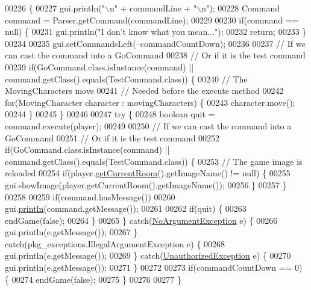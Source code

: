 \begin{DoxyCode}
00226                                                    \{
00227         gui.println(\textcolor{stringliteral}{"\(\backslash\)n"} + commandLine + \textcolor{stringliteral}{"\(\backslash\)n"});
00228         Command command = Parser.getCommand(commandLine);
00229 
00230         \textcolor{keywordflow}{if}(command == null) \{
00231             gui.println(\textcolor{stringliteral}{"I don't know what you mean..."});
00232             \textcolor{keywordflow}{return};
00233         \}
00234 
00235         gui.setCommandsLeft(--commandCountDown);
00236 
00237         \textcolor{comment}{// If we can cast the command into a GoCommand}
00238         \textcolor{comment}{// Or if it is the test command}
00239         \textcolor{keywordflow}{if}(GoCommand.class.isInstance(command) || command.getClass().equals(TestCommand.class)) \{
00240             \textcolor{comment}{// The MovingCharacters move}
00241             \textcolor{comment}{// Needed before the execute method}
00242             \textcolor{keywordflow}{for}(MovingCharacter character : movingCharacters) \{
00243                 character.move();
00244             \}
00245         \}
00246 
00247         \textcolor{keywordflow}{try} \{
00248             \textcolor{keywordtype}{boolean} quit = command.execute(player);
00249 
00250             \textcolor{comment}{// If we can cast the command into a GoCommand}
00251             \textcolor{comment}{// Or if it is the test command}
00252             \textcolor{keywordflow}{if}(GoCommand.class.isInstance(command) || command.getClass().equals(TestCommand.class)) \{
00253                 \textcolor{comment}{// The game image is reloaded}
00254                 \textcolor{keywordflow}{if}(player.\hyperlink{classpkg__world_1_1Player_a5ff0ede152d97c0c9cf6603c9a422a77}{getCurrentRoom}().getImageName() != null) \{
00255                     gui.showImage(player.getCurrentRoom().getImageName());
00256                 \}
00257             \}
00258 
00259             \textcolor{keywordflow}{if}(command.hasMessage())
00260                 gui.\hyperlink{classpkg__game_1_1UserInterface_ac4d82f989416d7cc64a6e2fba2f4ed75}{println}(command.getMessage());
00261 
00262             \textcolor{keywordflow}{if}(quit) \{
00263                 endGame(\textcolor{keyword}{false});
00264             \}
00265         \} \textcolor{keywordflow}{catch}(\hyperlink{classpkg__exceptions_1_1NoArgumentException}{NoArgumentException} e) \{
00266             gui.println(e.getMessage());
00267         \} \textcolor{keywordflow}{catch}(pkg\_exceptions.IllegalArgumentException e) \{
00268             gui.println(e.getMessage());
00269         \} \textcolor{keywordflow}{catch}(\hyperlink{classpkg__exceptions_1_1UnauthorizedException}{UnauthorizedException} e) \{
00270             gui.println(e.getMessage());
00271         \}
00272 
00273         \textcolor{keywordflow}{if}(commandCountDown == 0) \{
00274             endGame(\textcolor{keyword}{false});
00275         \}
00276 
00277     \}
\end{DoxyCode}


